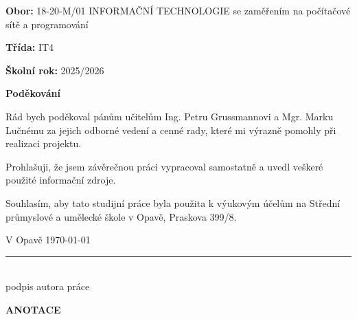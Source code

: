 \documentclass[a4paper,12pt]{article}
\begin{document}
\vspace{1cm}

\begin{flushleft}
    \textbf{Obor:} 18-20-M/01 INFORMAČNÍ TECHNOLOGIE se zaměřením na počítačové sítě a programování
    
    \vspace{0.3cm}
    
    \textbf{Třída:} IT4
    
    \vspace{0.3cm}
    
    \textbf{Školní rok:} 2025/2026
\end{flushleft}

\newpage

\thispagestyle{empty}

\textbf{Poděkování}

\vspace{0.5cm}

Rád bych poděkoval pánům učitelům Ing. Petru Grussmannovi a Mgr. Marku Lučnému za jejich odborné vedení a cenné rady, které mi výrazně pomohly při realizaci projektu.

\vfill

Prohlašuji, že jsem závěrečnou práci vypracoval samostatně a uvedl veškeré použité informační zdroje.

\vspace{1cm}

Souhlasím, aby tato studijní práce byla použita k výukovým účelům na Střední průmyslové a umělecké škole v Opavě, Praskova 399/8.

\vspace{2cm}

\begin{minipage}[t]{0.5\textwidth}
V Opavě \today
\end{minipage}
\begin{minipage}[t]{0.5\textwidth}
\flushright
\rule{6cm}{0.4pt}\\
podpis autora práce
\end{minipage}

\newpage

\thispagestyle{empty}

{\fontsize{18}{22}\selectfont\textbf{ANOTACE}}

\vspace{0.8cm}
\end{document}
